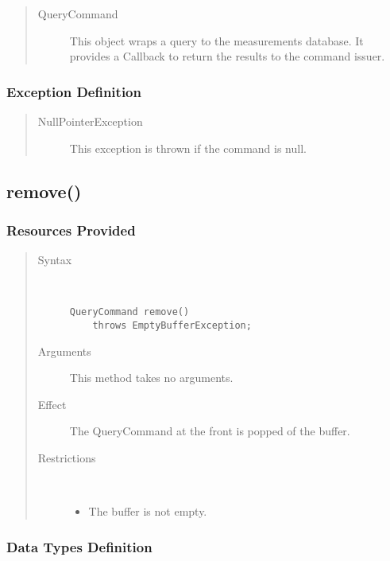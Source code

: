 \begin{quote}
	\begin{description}
		\item[QueryCommand] This object wraps a query to the measurements database. It
		provides a Callback to return the results to the command issuer.
	\end{description} 
\end{quote}

\subsubsection{Exception Definition}

\begin{quote}
	\begin{description}
		\item[NullPointerException] This exception is thrown if the command is null.
	\end{description} 
\end{quote}

\subsection{remove()}

\subsubsection{Resources Provided}

\begin{quote}
	\begin{description}
		\item[Syntax] \ 
		\begin{verbatim}
QueryCommand remove() 
    throws EmptyBufferException;
		\end{verbatim}
		\item[Arguments] This method takes no arguments.
		\item[Effect] The QueryCommand at the front is popped of the buffer.
		\item[Restrictions] \ 
		\begin{itemize}
			\item The buffer is not empty. 
		\end{itemize}
	\end{description} 
\end{quote}

\subsubsection{Data Types Definition}

